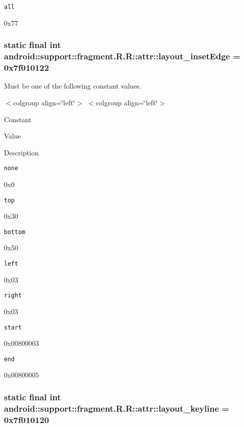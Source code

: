 {\tt all}

0x77\hypertarget{classandroid_1_1support_1_1fragment_1_1_r_1_1attr_f948ced9bc3715ba98b5d2a044774571}{
\subsubsection[{layout\_\-insetEdge}]{\setlength{\rightskip}{0pt plus 5cm}static final int android::support::fragment.R.R::attr::layout\_\-insetEdge = 0x7f010122}}
\label{classandroid_1_1support_1_1fragment_1_1_r_1_1attr_f948ced9bc3715ba98b5d2a044774571}


Must be one of the following constant values. \begin{TabularC}{0}
\hline
\end{TabularC}
$<$colgroup align=\char`\"{}left\char`\"{}$>$ $<$colgroup align=\char`\"{}left\char`\"{}$>$ 

Constant

Value

Description 

{\tt none}

0x0

{\tt top}

0x30

{\tt bottom}

0x50

{\tt left}

0x03

{\tt right}

0x03

{\tt start}

0x00800003

{\tt end}

0x00800005\hypertarget{classandroid_1_1support_1_1fragment_1_1_r_1_1attr_b5a3839cce354980f2c64df53893e87f}{
\subsubsection[{layout\_\-keyline}]{\setlength{\rightskip}{0pt plus 5cm}static final int android::support::fragment.R.R::attr::layout\_\-keyline = 0x7f010120}}
\label{classandroid_1_1support_1_1fragment_1_1_r_1_1attr_b5a3839cce354980f2c64df53893e87f}


